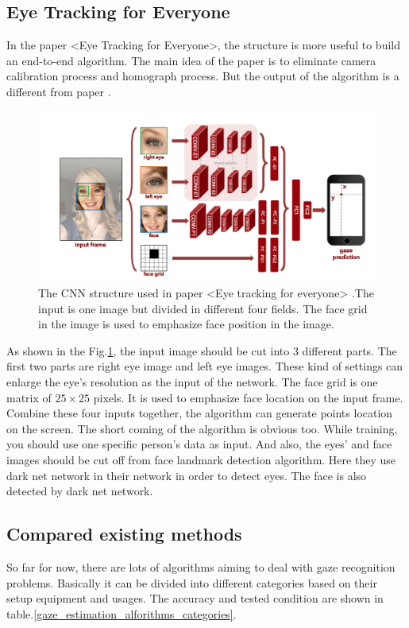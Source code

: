 \documentclass[senior]{IPSstyle}
\begin{document}
\subsection{Eye Tracking for Everyone}
In the paper <Eye Tracking for Everyone>\cite{krafka2016eye}, the structure is more useful to build an end-to-end algorithm.
The main idea of the paper is to eliminate camera calibration process and homograph process.
But the output of the algorithm is a different from paper \cite{zhang2015appearance}.
\begin{figure}[b]
    \centering
    \includegraphics[width=15cm]{MasterThesis-master/images/eye_tracking_cnn.png}
    \caption{The CNN structure used in paper <Eye tracking for everyone> \cite{krafka2016eye}.The input is one image but divided in different four fields. The face grid in the image is used to emphasize face position in the image.}
    \label{fig:eye_tracking_CNN}
\end{figure}
As shown in the Fig.\ref{fig:eye_tracking_CNN}, the input image should be cut into 3 different parts.
The first two parts are right eye image and left eye images.
These kind of settings can enlarge the eye's resolution as the input of the network.
The face grid is one matrix of $25 \times 25$ pixels.
It is used to emphasize face location on the input frame.
Combine these four inputs together, the algorithm can generate points location on the screen.
The short coming of the algorithm is obvious too.
While training, you should use one specific person's data as input.
And also, the eyes' and face images should be cut off from face landmark detection algorithm.
Here they use dark net network \cite{hinton2015distilling} in their network in order to detect eyes.
The face is also detected by dark net network\cite{hinton2015distilling}.


\subsection{Compared existing methods}
So far for now, there are lots of algorithms aiming to deal with gaze recognition problems.
Basically it can be divided into different categories based on their setup equipment and usages.
The accuracy and tested condition are shown in table.\ref{gaze_estimation_alforithms_categories}.
\end{document}
